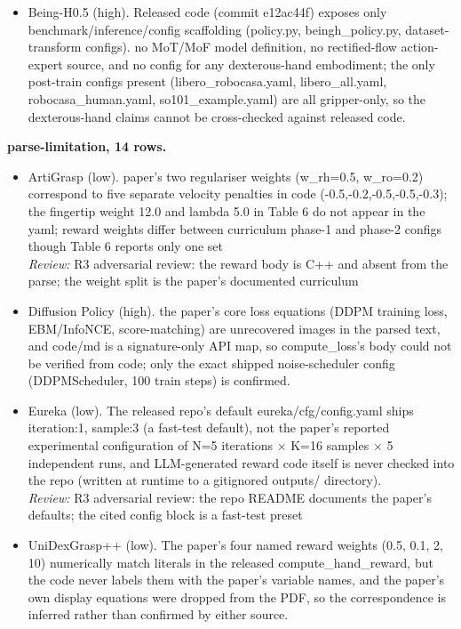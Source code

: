 \begin{itemize}
\item Being-H0.5 \cite{being_h05_2026} (high). Released code (commit e12ac44f) exposes only benchmark/inference/config scaffolding (policy.py, beingh\_\allowbreak{}policy.py, dataset-transform configs). no MoT/MoF model definition, no rectified-flow action-expert source, and no config for any dexterous-hand embodiment; the only post-train configs present (libero\_\allowbreak{}robocasa.yaml, libero\_\allowbreak{}all.yaml, robocasa\_\allowbreak{}human.yaml, so101\_\allowbreak{}example.yaml) are all gripper-only, so the dexterous-hand claims cannot be cross-checked against released code.
\end{itemize}

\textbf{parse-limitation, 14 rows.}

\begin{itemize}
\item ArtiGrasp \cite{artigrasp_2023} (low). paper's two regulariser weights (w\_\allowbreak{}rh=0.5, w\_\allowbreak{}ro=0.2) correspond to five separate velocity penalties in code (-0.5,-0.2,-0.5,-0.5,-0.3); the fingertip weight 12.0 and lambda 5.0 in Table 6 do not appear in the yaml; reward weights differ between curriculum phase-1 and phase-2 configs though Table 6 reports only one set
  \\ \emph{Review:} R3 adversarial review: the reward body is C++ and absent from the parse; the weight split is the paper's documented curriculum
\item Diffusion Policy \cite{diffusion_policy_2023} (high). the paper's core loss equations (DDPM training loss, EBM/InfoNCE, score-matching) are unrecovered images in the parsed text, and code/md is a signature-only API map, so compute\_\allowbreak{}loss's body could not be verified from code; only the exact shipped noise-scheduler config (DDPMScheduler, 100 train steps) is confirmed.
\item Eureka \cite{eureka_2023} (low). The released repo's default eureka/cfg/config.yaml ships iteration:1, sample:3 (a fast-test default), not the paper's reported experimental configuration of N=5 iterations $\times$ K=16 samples $\times$ 5 independent runs, and LLM-generated reward code itself is never checked into the repo (written at runtime to a gitignored outputs/ directory).
  \\ \emph{Review:} R3 adversarial review: the repo README documents the paper's defaults; the cited config block is a fast-test preset
\item UniDexGrasp++ \cite{unidexgrasp_pp_2023} (low). The paper's four named reward weights (0.5, 0.1, 2, 10) numerically match literals in the released compute\_\allowbreak{}hand\_\allowbreak{}reward, but the code never labels them with the paper's variable names, and the paper's own display equations were dropped from the PDF, so the correspondence is inferred rather than confirmed by either source.

\end{itemize}
